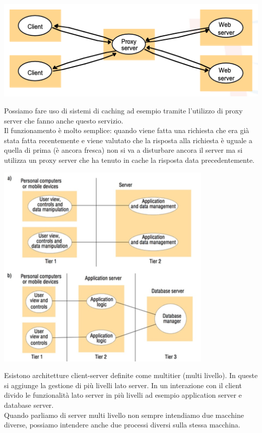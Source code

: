 \begin{center}
    \includegraphics[width = .7\textwidth]{images/lezione2/caching.png}
\end{center}
Possiamo fare uso di sistemi di caching ad esempio tramite l'utilizzo di proxy server che fanno anche questo servizio. \\
Il funzionamento è molto semplice: quando viene fatta una richiesta che era già stata fatta recentemente e viene valutato che la risposta alla richiesta è uguale a quella di prima (è ancora fresca) non si va a disturbare ancora il server ma si utilizza un proxy server che ha tenuto in cache la risposta data precedentemente.

\begin{center}
    \includegraphics[width = .5\textwidth]{images/lezione2/multitier.png}
\end{center}
Esistono architetture client-server definite come multitier (multi livello). In queste si aggiunge la gestione di più livelli lato server. In un interazione con il client divido le funzionalità lato server in più livelli ad esempio application server e database server. \\
Quando parliamo di server multi livello non sempre intendiamo due macchine diverse, possiamo intendere anche due processi diversi sulla stessa macchina.

